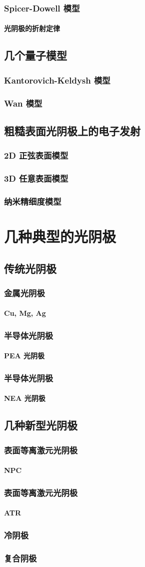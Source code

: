 \documentclass[ignorenonframetext, t]{beamer}
\begin{document}
\begin{frame}
	\frametitle{Spicer-Dowell 模型}
	\framesubtitle{光阴极的折射定律}
\end{frame}

\subsection{几个量子模型}

\begin{frame}
	\frametitle{Kantorovich-Keldysh 模型}
\end{frame}

\begin{frame}
	\frametitle{Wan 模型}
\end{frame}

\subsection{粗糙表面光阴极上的电子发射}

\begin{frame}
	\frametitle{2D 正弦表面模型}
\end{frame}

\begin{frame}
	\frametitle{\* 3D 任意表面模型}
\end{frame}

\begin{frame}
	\frametitle{\* 纳米精细度模型}
\end{frame}

\section{几种典型的光阴极}

\subsection{传统光阴极}

\begin{frame}
	\frametitle{金属光阴极}
	\framesubtitle{Cu, Mg, Ag}
\end{frame}

\begin{frame}
	\frametitle{半导体光阴极}
	\framesubtitle{PEA 光阴极}
\end{frame}

\begin{frame}
	\frametitle{半导体光阴极}
	\framesubtitle{NEA 光阴极}
\end{frame}

\subsection{几种新型光阴极}

\begin{frame}
	\frametitle{表面等离激元光阴极}
	\framesubtitle{NPC}
\end{frame}

\begin{frame}
	\frametitle{表面等离激元光阴极}
	\framesubtitle{ATR}
\end{frame}

\begin{frame}
	\frametitle{冷阴极}
\end{frame}

\begin{frame}
	\frametitle{复合阴极}
\end{frame}
\end{document}
